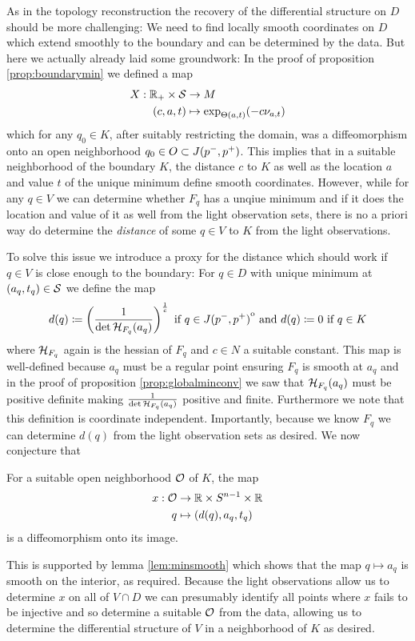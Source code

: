 As in the topology reconstruction the recovery of the differential structure on $D$ should be more challenging: We need to find locally smooth coordinates on $D$ which extend smoothly to the boundary and can be determined by the data. But here we actually already laid some groundwork: In the proof of proposition \ref{prop:boundarymin} we defined a map 
\begin{align*}
    X:\mathbb{R}_+\times {\mathcal{S}} &\to M \\
    (c,a,t)&\mapsto \exp_{\Theta(a,t)}(-c\nu_{a,t})
\end{align*}which for any $q_0\in K$, after suitably restricting the domain, was a diffeomorphism onto an open neighborhood $q_0\in O \subset J(p^-,p^+)$. This implies that in a suitable neighborhood of the boundary $K$, the distance $c$ to $K$ as well as the location $a$ and value $t$ of the unique minimum define smooth coordinates. However, while for any $q\in V$ we can determine whether $F_q$ has a unqiue minimum and if it does the location and value of it as well from the light observation sets, there is no a priori way do determine the \emph{distance} of some $q\in V$ to $K$ from the light observations. 

To solve this issue we introduce a proxy for the distance which should work if $q\in V$ is close enough to the boundary: For $q\in D$ with unique minimum at $(a_q,t_q)\in {\mathcal{S}}$ we define the map
\[
    d(q)\coloneqq  \left(\frac{1}{\det {\mathcal{H}}_{F_q}(a_q)}\right)^{\frac{1}{c}} \text{ if }q\in {\kern0ptJ(p^-,p^+)}^{\mathrm{o}} \text{ and }d(q)\coloneqq 0 \text{ if }q\in K
\] where ${\mathcal{H}}_{F_q}$ again is the hessian of $F_q$ and $c\in N$ a suitable constant.
This map is well-defined because $a_q$ must be a regular point ensuring $F_q$ is smooth at $a_q$ and in the proof of proposition \ref{prop:globalminconv} we saw that ${\mathcal{H}}_{F_q}(a_q)$ must be positive definite making $\frac{1}{\det {\mathcal{H}}_{F_q}(a_q)}$ positive and finite. Furthermore we note that this definition is coordinate independent. Importantly, because we know $F_q$ we can determine $d(q)$ from the light observation sets as desired. We now conjecture that 
\begin{conjecture}
    For a suitable open neighborhood ${\mathcal{O}}$ of $K$, the map 
    \begin{align*}
        x:{\mathcal{O}}&\to \mathbb{R} \times {S^{n-1}} \times \mathbb{R}\\
        q &\mapsto (d(q),a_q,t_q)
    \end{align*} is a diffeomorphism onto its image.
\end{conjecture}
This is supported by lemma \ref{lem:minsmooth} which shows that the map $q\mapsto a_q$ is smooth on the interior, as required. Because the light observations allow us to determine $x$ on all of $V\cap D$ we can presumably identify all points where $x$ fails to be injective and so determine a suitable ${\mathcal{O}}$ from the data, allowing us to determine the differential structure of $V$ in a neighborhood of $K$ as desired.


